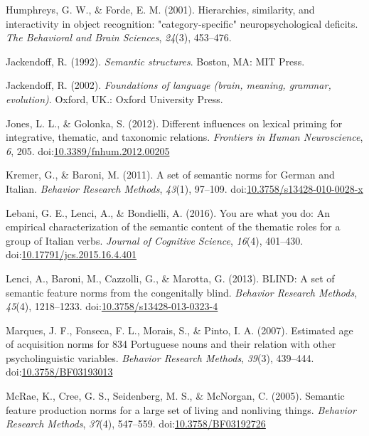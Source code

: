 \documentclass[man]{apa6}
\begin{document}
\leavevmode\hypertarget{ref-Humphreys2001}{}%
Humphreys, G. W., \& Forde, E. M. (2001). Hierarchies, similarity, and interactivity in object recognition: "category-specific" neuropsychological deficits. \emph{The Behavioral and Brain Sciences}, \emph{24}(3), 453--476.

\leavevmode\hypertarget{ref-Jackendoff1992}{}%
Jackendoff, R. (1992). \emph{Semantic structures}. Boston, MA: MIT Press.

\leavevmode\hypertarget{ref-Jackendoff2002}{}%
Jackendoff, R. (2002). \emph{Foundations of language (brain, meaning, grammar, evolution)}. Oxford, UK.: Oxford University Press.

\leavevmode\hypertarget{ref-Jones2012b}{}%
Jones, L. L., \& Golonka, S. (2012). Different influences on lexical priming for integrative, thematic, and taxonomic relations. \emph{Frontiers in Human Neuroscience}, \emph{6}, 205. doi:\href{https://doi.org/10.3389/fnhum.2012.00205}{10.3389/fnhum.2012.00205}

\leavevmode\hypertarget{ref-Kremer2011a}{}%
Kremer, G., \& Baroni, M. (2011). A set of semantic norms for German and Italian. \emph{Behavior Research Methods}, \emph{43}(1), 97--109. doi:\href{https://doi.org/10.3758/s13428-010-0028-x}{10.3758/s13428-010-0028-x}

\leavevmode\hypertarget{ref-Lebani2016}{}%
Lebani, G. E., Lenci, A., \& Bondielli, A. (2016). You are what you do: An empirical characterization of the semantic content of the thematic roles for a group of Italian verbs. \emph{Journal of Cognitive Science}, \emph{16}(4), 401--430. doi:\href{https://doi.org/10.17791/jcs.2015.16.4.401}{10.17791/jcs.2015.16.4.401}

\leavevmode\hypertarget{ref-Lenci2013}{}%
Lenci, A., Baroni, M., Cazzolli, G., \& Marotta, G. (2013). BLIND: A set of semantic feature norms from the congenitally blind. \emph{Behavior Research Methods}, \emph{45}(4), 1218--1233. doi:\href{https://doi.org/10.3758/s13428-013-0323-4}{10.3758/s13428-013-0323-4}

\leavevmode\hypertarget{ref-Marques2007a}{}%
Marques, J. F., Fonseca, F. L., Morais, S., \& Pinto, I. A. (2007). Estimated age of acquisition norms for 834 Portuguese nouns and their relation with other psycholinguistic variables. \emph{Behavior Research Methods}, \emph{39}(3), 439--444. doi:\href{https://doi.org/10.3758/BF03193013}{10.3758/BF03193013}

\leavevmode\hypertarget{ref-McRae2005}{}%
McRae, K., Cree, G. S., Seidenberg, M. S., \& McNorgan, C. (2005). Semantic feature production norms for a large set of living and nonliving things. \emph{Behavior Research Methods}, \emph{37}(4), 547--559. doi:\href{https://doi.org/10.3758/BF03192726}{10.3758/BF03192726}
\end{document}
